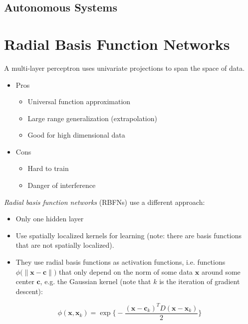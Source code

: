 \documentclass[a4paper, 11pt, accentcolor = tud3b]{tudreport}
\renewcommand{\vec}[1]{\mathbf{#1}}
\begin{document}
			\subsection{Autonomous Systems} %
		
		
		\section{Radial Basis Function Networks} %
			
			A multi-layer perceptron uses univariate projections to span the space of data.
			\begin{itemize}
				\item Pros
					\begin{itemize}
						\item Universal function approximation
						\item Large range generalization (extrapolation)
						\item Good for high dimensional data
					\end{itemize}
				\item Cons
					\begin{itemize}
						\item Hard to train
						\item Danger of interference
					\end{itemize}
			\end{itemize}
			\emph{Radial basis function networks} (RBFNs) use a different approach:
			\begin{itemize}
				\item Only one hidden layer
				\item Use spatially localized kernels for learning (note: there are basis functions that are not spatially localized).
				\item They use radial basis functions as activation functions, i.e. functions \( \phi\big(\lVert \vec{x} - \vec{c} \rVert\big) \) that only depend on the norm of some data \(\vec{x}\) around some center \(\vec{c}\), e.g. the Gaussian kernel (note that \(k\) is the iteration of gradient descent):
			\end{itemize}
			\begin{equation}
				\phi(\vec{x}, \vec{x}_k) = \exp\Bigg\{ -\frac{(\vec{x} - \vec{c}_k)^T D (\vec{x} - \vec{x}_k)}{2} \Bigg\}
			\end{equation}
\end{document}
